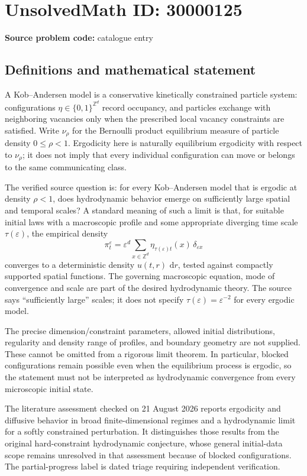 \documentclass[11pt]{article}
\newcommand{\Z}{\mathbb{Z}}
\newcommand{\dd}{\,\mathrm{d}}
\begin{document}
\section*{UnsolvedMath ID: 30000125}
\textbf{Source problem code:} catalogue entry
\subsection{Definitions and mathematical statement}
A Kob--Andersen model is a conservative kinetically constrained particle system: configurations $\eta\in\{0,1\}^{\Z^d}$ record occupancy, and particles exchange with neighboring vacancies only when the prescribed local vacancy constraints are satisfied. Write $\nu_\rho$ for the Bernoulli product equilibrium measure of particle density $0\le\rho<1$. Ergodicity here is naturally equilibrium ergodicity with respect to $\nu_\rho$; it does not imply that every individual configuration can move or belongs to the same communicating class.

The verified source question is: for every Kob--Andersen model that is ergodic at density $\rho<1$, does hydrodynamic behavior emerge on sufficiently large spatial and temporal scales? A standard meaning of such a limit is that, for suitable initial laws with a macroscopic profile and some appropriate diverging time scale $\tau(\varepsilon)$, the empirical density
\[
 \pi_t^\varepsilon=\varepsilon^d\sum_{x\in\Z^d}
                  \eta_{\tau(\varepsilon)t}(x)\,\delta_{\varepsilon x}
\]
converges to a deterministic density $u(t,r)\,\dd r$, tested against compactly supported spatial functions. The governing macroscopic equation, mode of convergence and scale are part of the desired hydrodynamic theory. The source says ``sufficiently large'' scales; it does not specify $\tau(\varepsilon)=\varepsilon^{-2}$ for every ergodic model.

The precise dimension/constraint parameters, allowed initial distributions, regularity and density range of profiles, and boundary geometry are not supplied. These cannot be omitted from a rigorous limit theorem. In particular, blocked configurations remain possible even when the equilibrium process is ergodic, so the statement must not be interpreted as hydrodynamic convergence from every microscopic initial state.

The literature assessment checked on 21 August 2026 reports ergodicity and diffusive behavior in broad finite-dimensional regimes and a hydrodynamic limit for a softly constrained perturbation. It distinguishes those results from the original hard-constraint hydrodynamic conjecture, whose general initial-data scope remains unresolved in that assessment because of blocked configurations. The partial-progress label is dated triage requiring independent verification.
\end{document}
